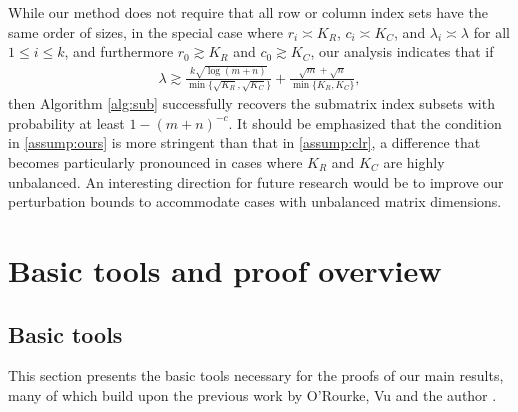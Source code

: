 \documentclass[reqno]{amsart}
\theoremstyle{plain}
\theoremstyle{definition}
\begin{document}
While our method does not require that all row or column index sets have the same order of sizes, in the special case where $r_i \asymp K_R$, $c_i \asymp K_C$, and $\lambda_i \asymp \lambda$ for all $1 \le i \le k$, and furthermore $r_0\gtrsim K_R$ and $c_0\gtrsim K_C$, our analysis indicates that if
\begin{align}\label{assump:ours}
\lambda \gtrsim   \frac{k \sqrt{\log(m+n)}}{\min\{\sqrt{K_R}, \sqrt{K_C} \}}+\frac{\sqrt m + \sqrt n}{\min\{K_R, K_C \}},
\end{align}
then Algorithm \ref{alg:sub} successfully recovers the submatrix index subsets with probability at least $1-(m+n)^{-c}$. It should be emphasized that the condition in \eqref{assump:ours} is more stringent than that in \eqref{assump:clr}, a difference that becomes particularly pronounced in cases where $K_R$ and $K_C$ are highly unbalanced. An interesting direction for future research would be to improve our perturbation bounds to accommodate cases with unbalanced matrix dimensions.

\section{Basic tools and proof overview}\label{sec:basic}


\subsection{Basic tools}\label{sec:LA} This section presents the basic tools necessary for the proofs of our main results, many of which build upon the previous work by O'Rourke, Vu and the author \cite{OVW22}.
\end{document}
